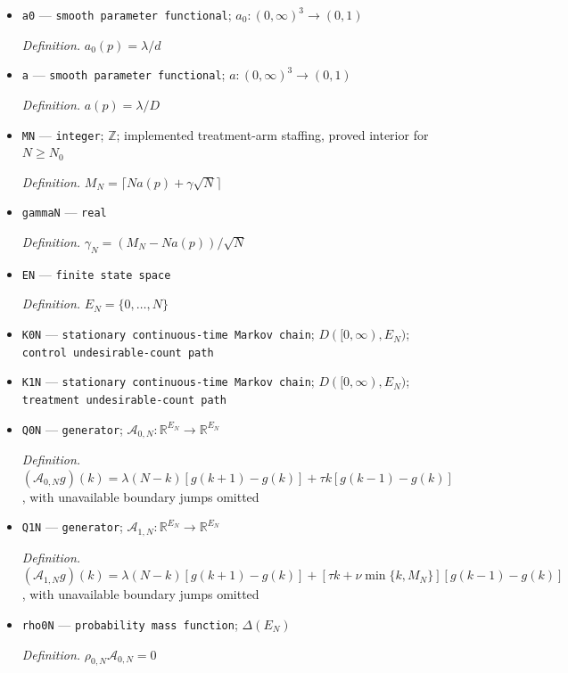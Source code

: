 \documentclass{article}
\begin{document}
\begin{itemize}
  \par\smallskip\noindent\emph{Definition.} \(D=\lambda+\tau+\nu\)
  \item \texttt{a0} --- \texttt{smooth parameter functional}; \(a_0:(0,\infty)^3\to(0,1)\)
  \par\smallskip\noindent\emph{Definition.} \(a_0(p)=\lambda/d\)
  \item \texttt{a} --- \texttt{smooth parameter functional}; \(a:(0,\infty)^3\to(0,1)\)
  \par\smallskip\noindent\emph{Definition.} \(a(p)=\lambda/D\)
  \item \texttt{MN} --- \texttt{integer}; \(\mathbb Z\); implemented treatment-arm staffing, proved interior for \(N\ge N_0\)
  \par\smallskip\noindent\emph{Definition.} \(M_N=\lceil Na(p)+\gamma\sqrt N\rceil\)
  \item \texttt{gammaN} --- \texttt{real}
  \par\smallskip\noindent\emph{Definition.} \(\gamma_N=(M_N-Na(p))/\sqrt N\)
  \item \texttt{EN} --- \texttt{finite state space}
  \par\smallskip\noindent\emph{Definition.} \(E_N=\{0,\ldots,N\}\)
  \item \texttt{K0N} --- \texttt{stationary continuous-\allowbreak{}time Markov chain}; \(D([0,\infty),E_N)\); \texttt{control undesirable-\allowbreak{}count path}
  \item \texttt{K1N} --- \texttt{stationary continuous-\allowbreak{}time Markov chain}; \(D([0,\infty),E_N)\); \texttt{treatment undesirable-\allowbreak{}count path}
  \item \texttt{Q0N} --- \texttt{generator}; \(\mathcal A_{0,N}:\mathbb R^{E_N}\to\mathbb R^{E_N}\)
  \par\smallskip\noindent\emph{Definition.} \((\mathcal A_{0,N}g)(k)=\lambda(N-k)[g(k+1)-g(k)]+\tau k[g(k-1)-g(k)]\), with unavailable boundary jumps omitted
  \item \texttt{Q1N} --- \texttt{generator}; \(\mathcal A_{1,N}:\mathbb R^{E_N}\to\mathbb R^{E_N}\)
  \par\smallskip\noindent\emph{Definition.} \((\mathcal A_{1,N}g)(k)=\lambda(N-k)[g(k+1)-g(k)]+[\tau k+\nu\min\{k,M_N\}][g(k-1)-g(k)]\), with unavailable boundary jumps omitted
  \item \texttt{rho0N} --- \texttt{probability mass function}; \(\Delta(E_N)\)
  \par\smallskip\noindent\emph{Definition.} \(\rho_{0,N}\mathcal A_{0,N}=0\)

\end{itemize}
\end{document}
